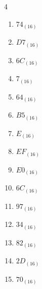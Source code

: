 \begin{multicols}{4}
\begin{enumerate}
        \phantom{$=168$}

  \item $74_{(16)}$

        \phantom{$=116$}

  \item $D7_{(16)}$

        \phantom{$=215$}

  \item $6C_{(16)}$

        \phantom{$=108$}

  \item $7_{(16)}$

        \phantom{$=7$}

  \item $64_{(16)}$

        \phantom{$=100$}

  \item $B5_{(16)}$

        \phantom{$=181$}

  \item $E_{(16)}$

        \phantom{$=14$}

  \item $EF_{(16)}$

        \phantom{$=239$}

\columnbreak %

  \item $E0_{(16)}$

        \phantom{$=224$}

  \item $6C_{(16)}$

        \phantom{$=108$}

  \item $97_{(16)}$

        \phantom{$=151$}

  \item $34_{(16)}$

        \phantom{$=52$}

  \item $82_{(16)}$

        \phantom{$=130$}

  \item $2D_{(16)}$

        \phantom{$=45$}

  \item $70_{(16)}$

        \phantom{$=112$}


\end{enumerate}
\end{multicols}
